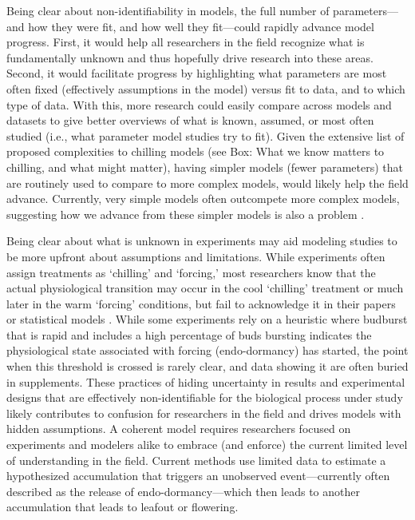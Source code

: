 \documentclass[11pt]{article}
\begin{document}
Being clear about non-identifiability in models, the full number of parameters---and how they were fit, and how well they fit---could rapidly advance model progress. First, it would help all researchers in the field recognize what is fundamentally unknown and thus hopefully drive research into these areas. Second, it would facilitate progress by highlighting what parameters are most often fixed (effectively assumptions in the model) versus fit to data, and to which type of data. With this, more research could easily compare across models and datasets to give better overviews of what is known, assumed, or most often studied (i.e., what parameter model studies try to fit). Given the extensive list of proposed complexities to chilling models (see Box: What we know matters to chilling, and what might matter), having simpler models (fewer parameters) that are routinely used to compare to more complex models, would likely help the field advance. Currently, very simple models often outcompete more complex models, suggesting how we advance from these simpler models is also a problem \citep[e.g.,][]{basler2016evaluating}. 

Being clear about what is unknown in experiments may aid modeling studies to be more upfront about assumptions and limitations. While experiments often assign treatments as `chilling' and `forcing,' most researchers know that the actual physiological transition may occur in the cool `chilling' treatment or much later in the warm `forcing' conditions, but fail to acknowledge it in their papers or statistical models \citep{ospreebbms,ospreenph2023}. While some experiments rely on a heuristic where budburst that is rapid and includes a high percentage of buds bursting indicates the physiological state associated with forcing (endo-dormancy) has started, the point when this threshold is crossed is rarely clear, and data showing it are often buried in supplements. These practices of hiding uncertainty in results and experimental designs that are effectively non-identifiable for the biological process under study likely contributes to confusion for researchers in the field and drives models with hidden assumptions. A coherent model requires researchers focused on experiments and modelers alike to embrace (and enforce) the current limited level of understanding in the field. Current methods use limited data to estimate a hypothesized accumulation that triggers an unobserved event---currently often described as the release of endo-dormancy---which then leads to another accumulation that leads to leafout or flowering. 
\end{document}
